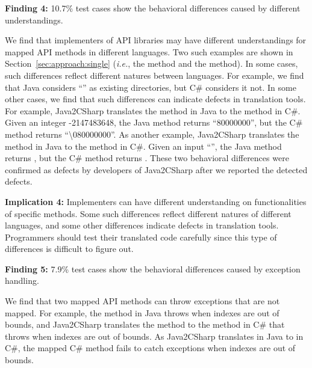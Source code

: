 \textbf{Finding 4:} 10.7\% test cases show the behavioral differences caused by different understandings.

We find that implementers of API libraries may have different understandings for mapped API methods in different languages. Two such examples are shown in Section~\ref{sec:approach:single} (\emph{i.e.}, the  method and the  method). In some cases, such differences reflect different natures between languages. For example, we find that Java considers ``\CodeIn{\textbackslash}'' as existing directories, but  C\# considers it not. In some other cases, we find that such differences can indicate defects in translation tools. For example, Java2CSharp translates the  method in Java to the  method in C\#.
Given an integer -2147483648, the Java method returns ``80000000'', but the C\# method returns ``\textbackslash080000000''. As another example, Java2CSharp translates the  method in Java to the  method in C\#. Given an input ``'', the Java method returns , but the C\# method returns . These two behavioral differences were confirmed as defects by developers of Java2CSharp after we reported the detected defects.

\textbf{Implication 4:} Implementers can have different understanding on functionalities of specific methods. Some such differences reflect different natures of different languages, and some other differences indicate  defects in translation tools. Programmers should test their translated code carefully since this type of differences is difficult to figure out.

\textbf{Finding 5:} 7.9\% test cases show the behavioral differences caused by exception handling.

We find that two mapped API methods can throw exceptions that are not mapped. For example, the  method in Java throws  when indexes are out of bounds, and Java2CSharp translates the method to the  method in C\# that throws  when indexes are out of bounds. As Java2CSharp translates  in Java to  in C\#, the mapped C\# method fails to catch exceptions when indexes are out of bounds.

